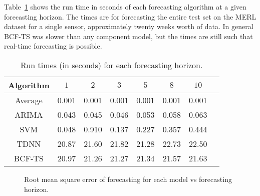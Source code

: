 Table~\ref{fig:runtimestab} shows the run time in seconds of each forecasting algorithm at a given forecasting horizon.  The times are for forecasting the entire test set on the MERL dataset for a single sensor, approximately twenty weeks worth of data.  In general BCF-TS was slower than any component model, but the times are still such that real-time forecasting is possible.

\begin{table}
\centering
\caption{Run times (in seconds) for each forecasting horizon.}
\begin{tabular}{|c|c|c|c|c|c|c|c|} \hline
Algorithm & $1$ & $2$ & $3$ & $5$ & $8$ & $10$ \\ \hline
Average & 0.001 & 0.001 & 0.001 & 0.001 & 0.001 & 0.001 \\ \hline
ARIMA & 0.043 & 0.045 & 0.046 & 0.053 & 0.058 & 0.063\\ \hline
SVM & 0.048 & 0.910 & 0.137 & 0.227 & 0.357 & 0.444 \\ \hline
TDNN & 20.87 & 21.60 & 21.82 & 21.28 & 22.73 & 22.50 \\ \hline
BCF-TS & 20.97 & 21.26 & 21.27 & 21.34 & 21.57 & 21.63\\ \hline
\end{tabular}
\label{fig:runtimestab}
\end{table}

\begin{figure}[!ht]
	\begin{center}
	\end{center}
	\caption{Root mean square error of forecasting for each model vs forecasting horizon.}
	\label{fig:rmseplot}
\end{figure}


